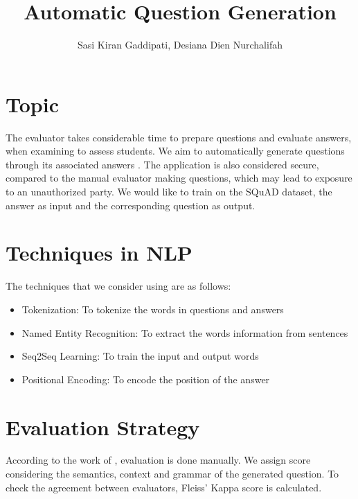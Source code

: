 \documentclass[a4paper, 11pt]{article}
\title{\vspace{-2cm}Automatic Question Generation}
\author{Sasi Kiran Gaddipati, Desiana Dien Nurchalifah}
\begin{document}
\maketitle
\section{Topic}
	The evaluator takes considerable time to prepare questions and evaluate answers, when examining to assess students. We aim to automatically generate questions through its associated answers \cite{zhou2017neural}. The application is also considered secure, compared to the manual evaluator making questions, which may lead to exposure to an unauthorized party. We would like to train on the SQuAD dataset, the answer as input and the corresponding question as output.

\section{Techniques in NLP}
The techniques that we consider using are as follows:
\begin{itemize}
	\setlength{\itemsep}{1pt}
	\item Tokenization: To tokenize the words in questions and answers
	\item Named Entity Recognition: To extract the words information from sentences
	\item Seq2Seq Learning: To train the input and output words
	\item Positional Encoding: To encode the position of the answer
	
\end{itemize}

\section{Evaluation Strategy}
	According to the work of \cite{zhou2017neural}, evaluation is done manually. We assign score considering the semantics, context and grammar of the generated question. To check the agreement between evaluators, Fleiss' Kappa score \cite{fleiss1971measuring} is calculated.



\end{document}
